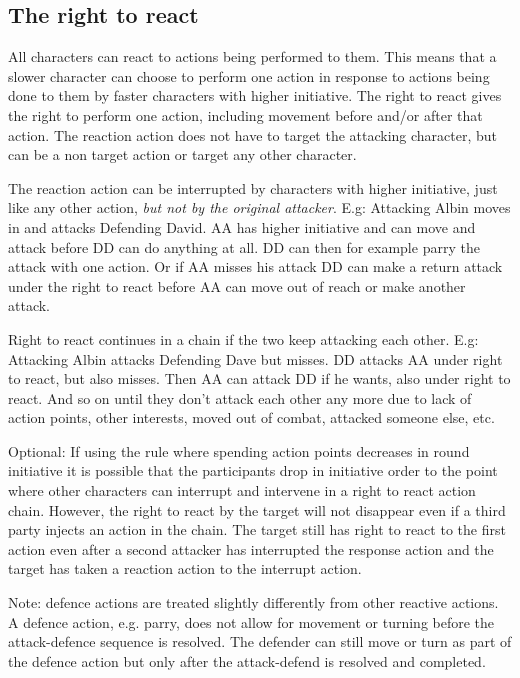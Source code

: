 \subsection*{The right to react}
\label{righttoreact}
All characters can react to actions being performed to them. This means that a slower character can choose to perform one action in response to actions being done to them by faster characters with higher initiative.
The right to react gives the right to perform one action, including movement before and/or after that action. The reaction action does not have to target the attacking character, but can be a non target action or target any other character.

The reaction action can be interrupted by characters with higher initiative, just like any other action, \emph{but not by the original attacker}. 
E.g: Attacking Albin moves in and attacks Defending David. AA has higher initiative and can move and attack before DD can do anything at all. DD can then for example parry the attack with one action. Or if AA misses his attack DD can make a return attack under the right to react before AA can move out of reach or make another attack.

Right to react continues in a chain if the two keep attacking each other.
E.g: Attacking Albin attacks Defending Dave but misses. DD attacks AA under right to react, but also misses. Then AA can attack DD if he wants, also under right to react. And so on until they don't attack each other any more due to lack of action points, other interests, moved out of combat, attacked someone else, etc.

Optional: If using the rule where spending action points decreases in round initiative it is possible that the participants drop in initiative order to the point where other characters can interrupt and intervene in a right to react action chain. However, the right to react by the target will not disappear even if a third party injects an action in the chain. The target still has right to react to the first action even after a second attacker has interrupted the response action and the target has taken a reaction action to the interrupt action.

Note: defence actions are treated slightly differently from other reactive actions. A defence action, e.g. parry, does not allow for movement or turning before the attack-defence sequence is resolved. The defender can still move or turn as part of the defence action but only after the attack-defend is resolved and completed. 

